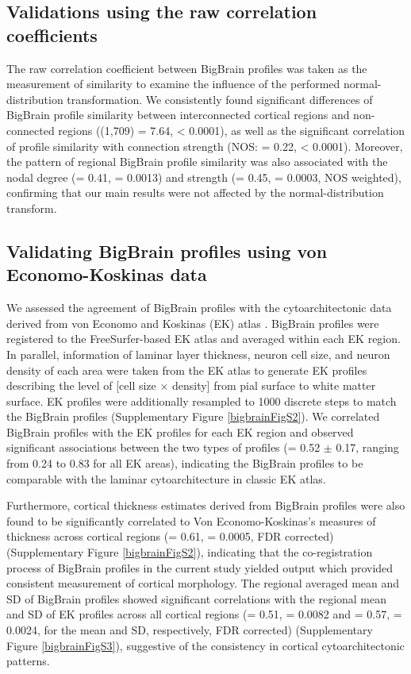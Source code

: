 \begin{refsection}
\subsection*{Validations using the raw correlation coefficients}
The raw correlation coefficient between BigBrain profiles was taken as the measurement of similarity to examine the influence of the performed normal-distribution transformation. We consistently found significant differences of BigBrain profile similarity between interconnected cortical regions and non-connected regions (\tvaldf(1,709) = 7.64, \pval < 0.0001), as well as the significant correlation of profile similarity with connection strength (NOS: \rval = 0.22, \pval < 0.0001). Moreover, the pattern of regional BigBrain profile similarity was also associated with the nodal degree (\rval = 0.41, \pval = 0.0013) and strength (\rval = 0.45, \pval = 0.0003, NOS weighted), confirming that our main results were not affected by the normal-distribution transform.

\subsection*{Validating BigBrain profiles using von Economo-Koskinas data}
We assessed the agreement of BigBrain profiles with the cytoarchitectonic data derived from von Economo and Koskinas (EK) atlas \citep{von1925cytoarchitektonik}. BigBrain profiles were registered to the FreeSurfer-based EK atlas \citep{Scholtens2015ECONOMO} and averaged within each EK region. In parallel, information of laminar layer thickness, neuron cell size, and neuron density of each area were taken from the EK atlas to generate EK profiles describing the level of [cell size $\times$ density] from pial surface to white matter surface. EK profiles were additionally resampled to 1000 discrete steps to match the BigBrain profiles (Supplementary Figure \ref{bigbrainFigS2}). We correlated BigBrain profiles with the EK profiles for each EK region and observed significant associations between the two types of profiles (\rval = 0.52 $\pm$ 0.17, ranging from 0.24 to 0.83 for all EK areas), indicating the BigBrain profiles to be comparable with the laminar cytoarchitecture in classic EK atlas.

Furthermore, cortical thickness estimates derived from BigBrain profiles were also found to be significantly correlated to Von Economo-Koskinas's measures of thickness across cortical regions (\rval = 0.61, \pval = 0.0005, FDR corrected) (Supplementary Figure \ref{bigbrainFigS2}), indicating that the co-registration process of BigBrain profiles in the current study yielded output which provided consistent measurement of cortical morphology. The regional averaged mean and SD of BigBrain profiles showed significant correlations with the regional mean and SD of EK profiles across all cortical regions (\rval = 0.51, \pval = 0.0082 and \rval = 0.57, \pval = 0.0024, for the mean and SD, respectively, FDR corrected) (Supplementary Figure \ref{bigbrainFigS3}), suggestive of the consistency in cortical cytoarchitectonic patterns.


\end{refsection}
